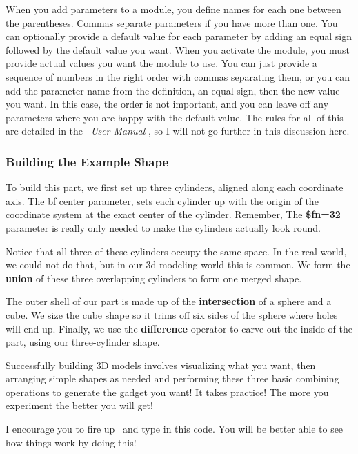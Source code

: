 When you add parameters to a module, you define names for each one between the
parentheses. Commas separate parameters if you have more than one. You can
optionally provide a default value for each parameter by adding an equal sign
followed by the default value you want. When you activate the module, you must
provide actual values you want the module to use. You can just provide a
sequence of numbers in the right order with commas separating them, or you can
add the parameter name from the definition, an equal sign, then the new value
you want. In this case, the order is not important, and you can leave off any
parameters where you are happy with the default value.  The rules for all of
this are detailed in the \osc\ {\it User Manual} \cite{userman}, so I will
not go further in this discussion here.

\subsubsection{Building the Example Shape}

To build this part, we first set up three cylinders, aligned along each
coordinate axis. The {bf center} parameter, sets each cylinder up with the
origin of the coordinate system at the exact center of the cylinder. Remember, The {\bf
\$fn=32} parameter is really only needed to make the cylinders actually look
round.

Notice that all three of these cylinders occupy the same space. In the real
world, we could not do that, but in our 3d modeling world this is common. We form
the {\bf union} of these three overlapping cylinders to form one merged shape.

The outer shell of our part is made up of the {\bf intersection} of a sphere
and a cube. We size the cube shape so it trims off six sides of the sphere
where holes will end up.  Finally, we use the {\bf difference} operator to
carve out the inside of the part, using our three-cylinder shape.

Successfully building 3D models involves visualizing what you want, then
arranging simple shapes as needed and performing these three basic combining
operations to generate the gadget you want! It takes practice! The more you
experiment the better you will get!

I encourage you to fire up \osc\ and type in this code. You will be better
able to see how things work by doing this!
